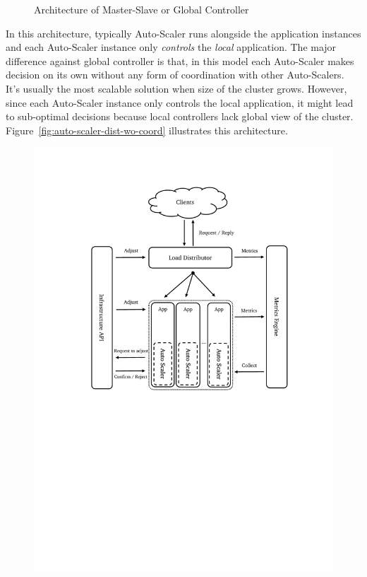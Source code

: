 \begin{description}[leftmargin=0pt]
\begin{figure}[hb]
        \centering
        \caption{Architecture of Master-Slave or Global Controller}
        \label{fig:auto-scaler-master-backup}
    \end{figure}
    \clearpage
    \item[Distributed Without Coorindation] In this architecture, typically Auto-Scaler runs alongside the application instances and each Auto-Scaler instance only \emph{controls} the \emph{local} application. The major difference against global controller is that, in this model each Auto-Scaler makes decision on its own without any form of coordination with other Auto-Scalers. It's usually the most scalable solution when size of the cluster grows. However, since each Auto-Scaler instance only controls the local application, it might lead to sub-optimal decisions because local controllers lack global view of the cluster. Figure~\ref{fig:auto-scaler-dist-wo-coord} illustrates this architecture.
    \begin{figure}[hb]
        \includegraphics[clip, trim=3cm 12.2cm 2.5cm 2.5cm]{auto-scaler-full-dist.pdf}

\end{figure}
\end{description}
